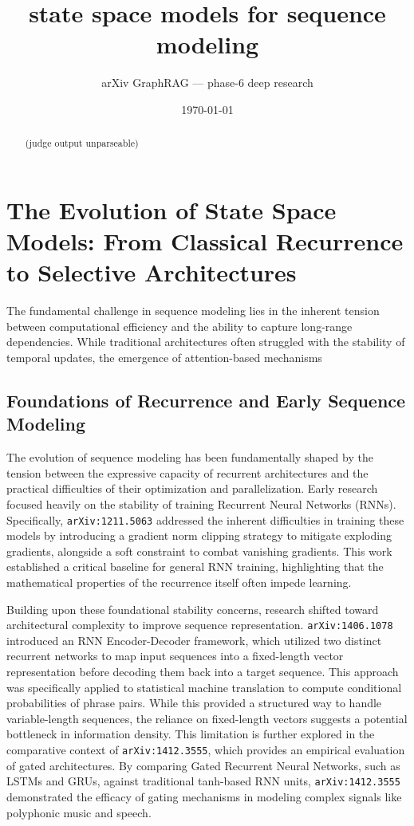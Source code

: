 \documentclass[11pt]{article}
\title{state space models for sequence modeling}
\author{arXiv GraphRAG --- phase-6 deep research}
\date{\today}
\begin{document}
\maketitle

\begin{abstract}
(judge output unparseable)
\end{abstract}

\section{The Evolution of State Space Models: From Classical Recurrence to Selective Architectures}

The fundamental challenge in sequence modeling lies in the inherent tension between computational efficiency and the ability to capture long-range dependencies. While traditional architectures often struggled with the stability of temporal updates, the emergence of attention-based mechanisms

\subsection{Foundations of Recurrence and Early Sequence Modeling}

The evolution of sequence modeling has been fundamentally shaped by the tension between the expressive capacity of recurrent architectures and the practical difficulties of their optimization and parallelization. Early research focused heavily on the stability of training Recurrent Neural Networks (RNNs). Specifically, \texttt{arXiv:1211.5063} addressed the inherent difficulties in training these models by introducing a gradient norm clipping strategy to mitigate exploding gradients, alongside a soft constraint to combat vanishing gradients. This work established a critical baseline for general RNN training, highlighting that the mathematical properties of the recurrence itself often impede learning.

Building upon these foundational stability concerns, research shifted toward architectural complexity to improve sequence representation. \texttt{arXiv:1406.1078} introduced an RNN Encoder-Decoder framework, which utilized two distinct recurrent networks to map input sequences into a fixed-length vector representation before decoding them back into a target sequence. This approach was specifically applied to statistical machine translation to compute conditional probabilities of phrase pairs. While this provided a structured way to handle variable-length sequences, the reliance on fixed-length vectors suggests a potential bottleneck in information density. This limitation is further explored in the comparative context of \texttt{arXiv:1412.3555}, which provides an empirical evaluation of gated architectures. By comparing Gated Recurrent Neural Networks, such as LSTMs and GRUs, against traditional tanh-based RNN units, \texttt{arXiv:1412.3555} demonstrated the efficacy of gating mechanisms in modeling complex signals like polyphonic music and speech.
\end{document}
